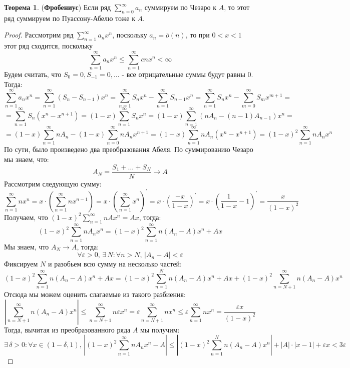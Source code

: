 \documentclass[12pt]{article}
\newcommand{\VE}{\varepsilon}
\theoremstyle{definition}
\newtheorem{theorem}{Теорема}
\newcommand{\ddsum}[2]{\displaystyle\sum\limits_{#1}^{#2}}
\begin{document}
\begin{theorem}(\textbf{Фробениус})
	Если ряд $\ddsum{n = 0}{\infty}a_n$ суммируем по Чезаро к $A$, то этот ряд суммируем по Пуассону-Абелю тоже к $A$.
\end{theorem}
\begin{proof}
	Рассмотрим ряд $\ddsum{n = 1}{\infty}a_n x^n$, поскольку $a_n = \overline{o}(n)$, то при $0 < x < 1$ этот ряд сходится, поскольку 
	$$
		\ddsum{n = 1}{\infty} a_n x^n \leq \ddsum{n = 1}{\infty}cn x^n < \infty
	$$
	Будем считать, что $S_0 = 0, S_{-1} = 0, \dotsc$ - все отрицательные суммы будут равны $0$. Тогда:
	$$
		\ddsum{n = 1}{\infty} a_n x^n = \ddsum{n = 1}{\infty} (S_n - S_{n-1}) x^n = \ddsum{n = 1}{\infty} S_n x^n - \ddsum{n = 1}{\infty} S_{n-1} x^{n}=  \ddsum{n = 1}{\infty} S_n x^n - \ddsum{m = 0}{\infty} S_m x^{m +1} = 
	$$
	$$	
		= \ddsum{n = 1}{\infty}S_n(x^n - x^{n + 1}) = (1 - x)\ddsum{n = 1}{\infty}S_n x^n = (1-x)\ddsum{n = 1}{\infty}\left(nA_n - (n-1)A_{n-1}\right)x^n = 
	$$
	$$
		= (1-x)\ddsum{n = 1}{\infty}nA_n - (1-x)\ddsum{n = 0}{\infty}nA_{n}x^{n+1} = (1- x)\ddsum{n = 1}{\infty}n A_n (x^n - x^{n+1})= (1- x)^2\ddsum{n = 1}{\infty}n A_n x^n
	$$
	По сути, было произведено два преобразования Абеля. По суммированию Чезаро мы знаем, что:
	$$
		A_N = \dfrac{S_1 + \dotsc + S_N}{N} \to A
	$$
	Рассмотрим следующую сумму:
	$$
		\ddsum{n = 1}{\infty}n x^n = x {\cdot}\left(\ddsum{n = 1}{\infty}n x^{n-1}\right) = x{\cdot} \left(\ddsum{n = 1}{\infty} x^{n}\right)^\prime = x{\cdot}\left(\dfrac{-x}{1 - x}\right)^\prime = x{\cdot}\left(\dfrac{1}{1 -x} - 1\right)^\prime = \dfrac{x}{(1 - x)^2}
	$$
	Получаем, что $(1- x)^2\ddsum{n = 1}{\infty}nA x^n = Ax$, тогда:
	$$
		(1- x)^2\ddsum{n = 1}{\infty}n A_n x^n = (1- x)^2\ddsum{n = 1}{\infty}n (A_n -A) x^n + Ax
	$$
	Мы знаем, что $A_N \to A$, тогда:
	$$
		\forall \VE > 0, \, \exists \, N \colon \forall n > N, \, |A_n - A|< \VE
	$$
	Фиксируем $N$ и разобьем всю сумму на несколько частей:
	$$
		(1- x)^2\ddsum{n = 1}{\infty}n (A_n -A) x^n + Ax = (1- x)^2\ddsum{n = 1}{N}n (A_n -A) x^n + Ax + (1- x)^2\ddsum{n = {N+1}}{\infty}n (A_n -A) x^n
	$$
	Отсюда мы можем оценить слагаемые из такого разбиения:
	$$
		\left|\ddsum{n = {N+1}}{\infty}n (A_n -A) x^n\right| \leq \ddsum{n = N + 1}{\infty}n\VE x^n = \VE \ddsum{n = N + 1}{\infty}n x^n \leq \VE \ddsum{n = 1}{\infty}nx ^n = \dfrac{\VE x }{(1 -x)^2}
	$$
	Тогда, вычитая из преобразованного ряда $A$ мы получим:
	$$
		\exists \, \delta > 0 \colon \forall x \in (1- \delta, 1), \, \left|(1- x)^2\ddsum{n = 1}{\infty}n A_n x^n - A \right| \leq \left| (1- x)^2\ddsum{n = 1}{N}n (A_n -A) x^n \right| + |A|{\cdot}|x - 1| + \VE x < 3\VE
	$$
\end{proof}
\end{document}
